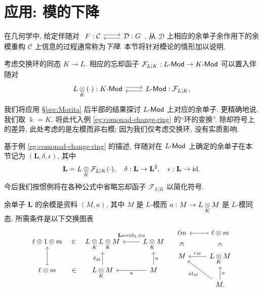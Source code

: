 \section{应用: 模的下降}\label{sec:descent-modules}
在几何学中, 给定伴随对
$\begin{tikzcd}
	F: \mathcal{C} \arrow[shift left, r] & \mathcal{D}: G \arrow[shift left, l]
\end{tikzcd}$,
从 $\mathcal{D}$ 上相应的余单子余作用下的余模重构 $\mathcal{C}$ 上信息的过程通常称为\emph{下降}. 本节将针对模论的情形加以说明.

考虑交换环的同态 $K \to L$. 相应的忘却函子 $\mathcal{F}_{L|K}: L\text{-}\mathsf{Mod} \to K\text{-}\mathsf{Mod}$ 可以置入伴随对
\[\begin{tikzcd}
	L \dotimes{K} (\cdot): K\dcate{Mod} \arrow[shift left, r] & L\dcate{Mod} : \mathcal{F}_{L|K}, \arrow[shift left, l]
\end{tikzcd}\]
我们将应用 \S\ref{sec:Morita} 后半部的结果探讨 $L\text{-}\mathsf{Mod}$ 上对应的余单子. 更精确地说, 我们取 $\Bbbk = K$, 将此代入例 \ref{eg:comonad-change-ring} 的``环的变换''. 除却符号上的差异, 此处考虑的是左模而非右模; 因为我们仅考虑交换环, 没有实质影响.

基于例 \ref{eg:comonad-change-ring} 的描述, 伴随对在 $L\text{-}\mathsf{Mod}$ 上确定的余单子在本节记为 $(\mathbf{L}, \delta, \epsilon)$, 其中
\[ \mathbf{L} = L \underset{K}{\otimes} \mathcal{F}_{L|K}(\cdot), \quad \delta: \mathbf{L} \to \mathbf{L}^2, \quad \epsilon: \mathbf{L} \to \mathrm{id}. \]
今后我们按惯例将在各种公式中省略忘却函子 $\mathcal{F}_{L|K}$ 以简化符号.

余单子 $\mathbf{L}$ 的余模是资料 $(M, a)$, 其中 $M$ 是 $L$-模而 $a: M \to L \underset{K}{\otimes} M$ 是 $L$-模同态, 所需条件是以下交换图表
\[\begin{tikzcd}
	\ell \otimes 1 \otimes m \arrow[phantom, r, "\in" description] & L \dotimes{K} L \dotimes{K} M & L \dotimes{K} M \arrow[l, "{\mathbf{L}a = \identity_L \otimes a}"' inner sep=0.6em] \\
	\ell \otimes m \arrow[phantom, r, "\in" description] \arrow[mapsto, u] & L \dotimes{K} M \arrow[u, "\delta_M"] & M \arrow[l, "a"] \arrow[u, "a"']
\end{tikzcd} \quad \begin{tikzcd}
	\ell m \arrow[phantom, d, "\in" description, sloped] & \ell \otimes m \arrow[phantom, d, "\in" description, sloped] \arrow[mapsto, l] \\
	M & L \dotimes{K} M \arrow[l, "\epsilon_M"'] \\
	& M. \arrow[lu, "\identity_M"] \arrow[u, "a"']
\end{tikzcd}\]

